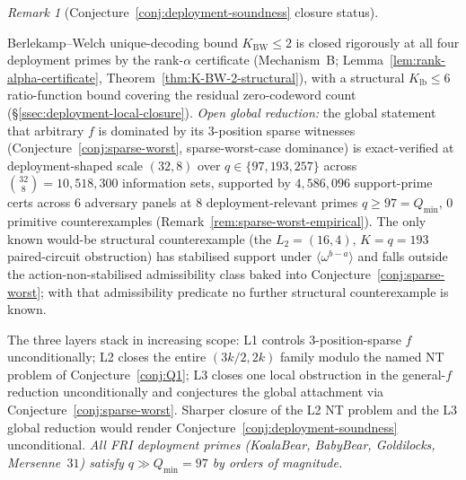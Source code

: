 \documentclass[11pt]{article}
\theoremstyle{definition}
\theoremstyle{remark}
\newtheorem{remark}[theorem]{Remark}
\begin{document}
\begin{remark}[Conjecture~\ref{conj:deployment-soundness} closure status]
\begin{itemize}[nosep,leftmargin=*]
Berlekamp--Welch unique-decoding bound $K_{\mathrm{BW}} \leq 2$ is
closed rigorously at all four deployment primes by the rank-$\alpha$
certificate (Mechanism~B; Lemma~\ref{lem:rank-alpha-certificate},
Theorem~\ref{thm:K-BW-2-structural}), with a structural
$K_{\mathrm{lb}} \leq 6$ ratio-function bound covering the residual
zero-codeword count
(\S\ref{ssec:deployment-local-closure}).
\emph{Open global reduction:} the global statement that arbitrary $f$
is dominated by its $3$-position sparse witnesses
(Conjecture~\ref{conj:sparse-worst}, sparse-worst-case dominance) is
exact-verified at deployment-shaped scale $(32, 8)$ over
$q \in \{97, 193, 257\}$ across $\binom{32}{8} = 10{,}518{,}300$
information sets, supported by $4{,}586{,}096$ support-prime certs
across $6$ adversary panels at $8$ deployment-relevant primes
$q \geq 97 = Q_{\min}$, $0$ primitive counterexamples
(Remark~\ref{rem:sparse-worst-empirical}). The only known would-be
structural counterexample (the $L_2 = (16, 4)$,
$K = q = 193$ paired-circuit obstruction) has stabilised support
under $\langle\omega^{b-a}\rangle$ and falls outside the
action-non-stabilised admissibility class baked into
Conjecture~\ref{conj:sparse-worst}; with that admissibility predicate
no further structural counterexample is known.
\end{itemize}
The three layers stack in increasing scope: L1 controls
$3$-position-sparse $f$ unconditionally; L2 closes the entire
$(3k/2, 2k)$ family modulo the named NT problem of
Conjecture~\ref{conj:Q1}; L3 closes one local obstruction in the
general-$f$ reduction unconditionally and conjectures the global
attachment via Conjecture~\ref{conj:sparse-worst}. Sharper closure of
the L2 NT problem and the L3 global reduction would render
Conjecture~\ref{conj:deployment-soundness}
unconditional.
\emph{All FRI deployment primes (KoalaBear, BabyBear, Goldilocks,
Mersenne~$31$) satisfy $q \gg Q_{\min} = 97$ by orders of
magnitude.}
\end{remark}

\end{document}
